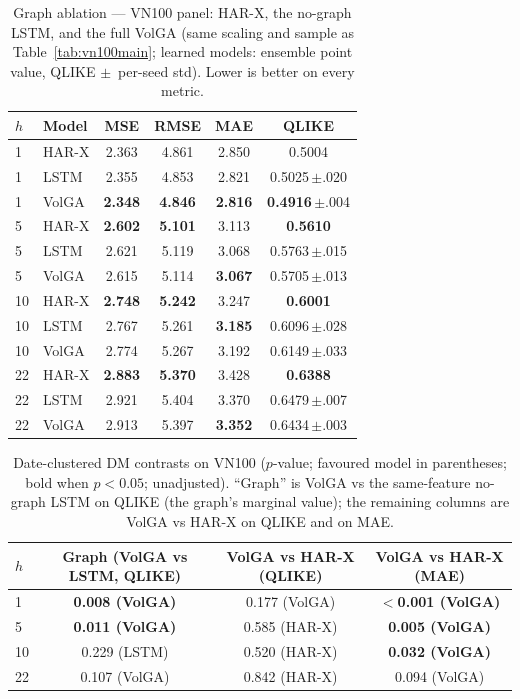 \documentclass[runningheads]{llncs}
\begin{document}
\begin{table}[t]
\centering
\caption{Graph ablation --- VN100 panel: HAR-X, the no-graph LSTM, and the full VolGA (same scaling
and sample as Table~\ref{tab:vn100main}; learned models: ensemble point value, QLIKE $\pm$~per-seed
std). Lower is better on every metric.}
\label{tab:vn100graph}
\footnotesize
\setlength{\tabcolsep}{6pt}
\begin{tabular}{llcccc}
\toprule
$h$ & Model & MSE & RMSE & MAE & QLIKE \\
\midrule
1 & HAR-X & 2.363 & 4.861 & 2.850 & 0.5004 \\
1 & LSTM  & 2.355 & 4.853 & 2.821 & 0.5025\,$\pm$.020 \\
1 & VolGA & \textbf{2.348} & \textbf{4.846} & \textbf{2.816} & \textbf{0.4916}\,$\pm$.004 \\
\midrule
5 & HAR-X & \textbf{2.602} & \textbf{5.101} & 3.113 & \textbf{0.5610} \\
5 & LSTM  & 2.621 & 5.119 & 3.068 & 0.5763\,$\pm$.015 \\
5 & VolGA & 2.615 & 5.114 & \textbf{3.067} & 0.5705\,$\pm$.013 \\
\midrule
10 & HAR-X & \textbf{2.748} & \textbf{5.242} & 3.247 & \textbf{0.6001} \\
10 & LSTM  & 2.767 & 5.261 & \textbf{3.185} & 0.6096\,$\pm$.028 \\
10 & VolGA & 2.774 & 5.267 & 3.192 & 0.6149\,$\pm$.033 \\
\midrule
22 & HAR-X & \textbf{2.883} & \textbf{5.370} & 3.428 & \textbf{0.6388} \\
22 & LSTM  & 2.921 & 5.404 & 3.370 & 0.6479\,$\pm$.007 \\
22 & VolGA & 2.913 & 5.397 & \textbf{3.352} & 0.6434\,$\pm$.003 \\
\bottomrule
\end{tabular}
\end{table}

\begin{table}[t]
\centering
\caption{Date-clustered DM contrasts on VN100 ($p$-value; favoured model in parentheses; bold when
$p<0.05$; unadjusted). ``Graph'' is VolGA vs the same-feature no-graph LSTM on QLIKE (the graph's
marginal value); the remaining columns are VolGA vs HAR-X on QLIKE and on MAE.}
\label{tab:dm-vn100}
\footnotesize
\setlength{\tabcolsep}{6pt}
\begin{tabular}{lccc}
\toprule
$h$ & Graph (VolGA vs LSTM, QLIKE) & VolGA vs HAR-X (QLIKE) & VolGA vs HAR-X (MAE) \\
\midrule
1  & \textbf{0.008 (VolGA)} & 0.177 (VolGA) & \textbf{$<$0.001 (VolGA)} \\
5  & \textbf{0.011 (VolGA)} & 0.585 (HAR-X) & \textbf{0.005 (VolGA)} \\
10 & 0.229 (LSTM)           & 0.520 (HAR-X) & \textbf{0.032 (VolGA)} \\
22 & 0.107 (VolGA)          & 0.842 (HAR-X) & 0.094 (VolGA) \\
\bottomrule
\end{tabular}
\end{table}
\end{document}
